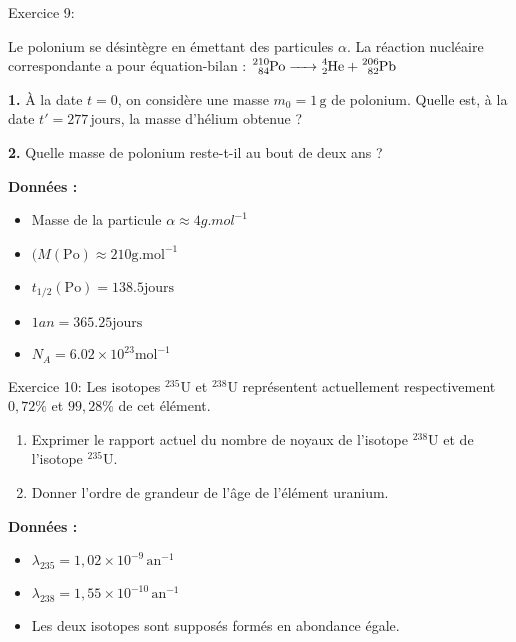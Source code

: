 \documentclass[12pt, french]{article}
\begin{document}
\begin{Box2}{Exercice 9:}
  
Le polonium se désintègre en émettant des particules \(\alpha\). La réaction nucléaire correspondante a pour équation-bilan :
$
  \ce{^{210}_{84}\mathrm{Po} -> ^{4}_{2}\mathrm{He} + ^{206}_{82}\mathrm{Pb}}
$
\vspace{0.5cm}

\textbf{1.} À la date \(t = 0\), on considère une masse \(m_0 = 1 \, \mathrm{g}\) de polonium.  
Quelle est, à la date \(t' = 277 \, \mathrm{jours}\), la masse d’hélium obtenue ?  

\vspace{0.5cm}

\textbf{2.} Quelle masse de polonium reste-t-il au bout de deux ans ?  

\vspace{0.5cm}

\textbf{Données :}
\begin{itemize}
  \item Masse de la particule $\alpha \approx 4 g.mol^{-1}$ 
    \item $(M(\mathrm{Po}) \approx 210  \mathrm{g.mol}^{-1}$
    \item $t_{1/2}(\mathrm{Po}) = 138.5  \mathrm{jours}$
    \item $1an = 365.25  \mathrm{jours}$
    \item $N_A = 6.02 \times 10^{23}  \mathrm{mol}^{-1}$
\end{itemize}
\end{Box2}


\begin{Box2}{Exercice 10:}
 Les isotopes \(^{235}\mathrm{U}\) et \(^{238}\mathrm{U}\) représentent actuellement respectivement \(0,72\%\) et \(99,28\%\) de cet élément.

\begin{enumerate}
    \item Exprimer le rapport actuel du nombre de noyaux de l’isotope \(^{238}\mathrm{U}\) et de l’isotope \(^{235}\mathrm{U}\).
    \item Donner l’ordre de grandeur de l’âge de l’élément uranium.
\end{enumerate}

\textbf{Données :}
\begin{itemize}
    \item \(\lambda_{235} = 1,02 \times 10^{-9} \, \mathrm{an}^{-1}\)
    \item \(\lambda_{238} = 1,55 \times 10^{-10} \, \mathrm{an}^{-1}\)
    \item Les deux isotopes sont supposés formés en abondance égale.
\end{itemize} 
\end{Box2}
\end{document}
